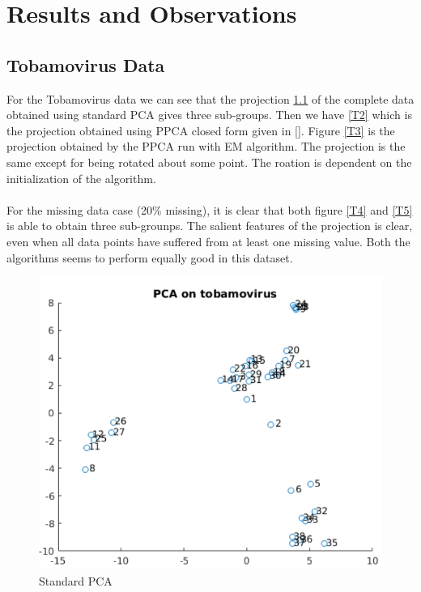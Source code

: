 \chapter{Results and Observations}

\section{Tobamovirus Data}
For the Tobamovirus data we can see that the projection \ref{T1} of the complete data obtained using standard PCA gives three sub-groups. Then we have \ref{T2} which is the projection obtained using PPCA closed form given in []. Figure \ref{T3} is the projection obtained by the PPCA run with EM algorithm. The projection is the same except for being rotated about some point. The roation is dependent on the initialization of the algorithm.\\\\
For the missing data case (20\% missing), it is clear that both figure \ref{T4} and \ref{T5} is able to obtain three sub-grounps. The salient features of the projection  is clear, even when all data points have suffered from at least one missing value. Both the algorithms seems to perform equally good in this dataset.
\begin{figure}
	\centering
  	\includegraphics[width=1.0\textwidth]{./images/PCA.png}
  	\caption{Standard PCA}
  	\label{T1}
\end{figure}

